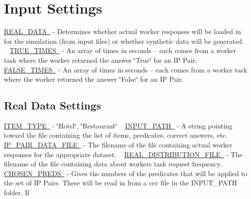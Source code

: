 \hypertarget{toggles_input}{}\section{Input Settings}\label{toggles_input}
\mbox{\hyperlink{namespacedynamicfilterapp_1_1toggles_a00674fe8ef8f59b37d7fe239813bb627}{R\+E\+A\+L\+\_\+\+D\+A\+TA }} -\/ Determines whether actual worker responses will be loaded in for the simulation (from input files) or whether synthetic data will be generated. ~\newline
 \mbox{\hyperlink{namespacedynamicfilterapp_1_1toggles_a6794acc9ab30adea862f4077cf9adae7}{T\+R\+U\+E\+\_\+\+T\+I\+M\+ES }} -\/ An array of times in seconds -- each comes from a worker task where the worker returned the answer \char`\"{}\+True\char`\"{} for an IP Pair. ~\newline
 \mbox{\hyperlink{namespacedynamicfilterapp_1_1toggles_a809d01bf46cd20093532e7cbc0960874}{F\+A\+L\+S\+E\+\_\+\+T\+I\+M\+ES }} -\/ An array of times in seconds -- each comes from a worker task where the worker returned the answer \char`\"{}\+False\char`\"{} for an IP Pair.\hypertarget{toggles_realdata}{}\subsection{Real Data Settings}\label{toggles_realdata}
\mbox{\hyperlink{namespacedynamicfilterapp_1_1toggles_ab7ef0f87c772b28128250ee46f5390ab}{I\+T\+E\+M\+\_\+\+T\+Y\+PE }} -\/ \char`\"{}\+Hotel\char`\"{}, \char`\"{}\+Restaurant\char`\"{} ~\newline
 \mbox{\hyperlink{namespacedynamicfilterapp_1_1toggles_aca6b14e235be3a92f729918cfcfed5e5}{I\+N\+P\+U\+T\+\_\+\+P\+A\+TH }} -\/ A string pointing toward the file containing the list of items, predicates, correct answers, etc.~\newline
 \mbox{\hyperlink{namespacedynamicfilterapp_1_1toggles_a43d654f8629542974ec1db04c0fc580a}{I\+P\+\_\+\+P\+A\+I\+R\+\_\+\+D\+A\+T\+A\+\_\+\+F\+I\+LE }} -\/ The filename of the file containing actual worker responses for the appropriate dataset. ~\newline
 \mbox{\hyperlink{namespacedynamicfilterapp_1_1toggles_ad581376e3eb6ca15bbbe096863891cec}{R\+E\+A\+L\+\_\+\+D\+I\+S\+T\+R\+I\+B\+U\+T\+I\+O\+N\+\_\+\+F\+I\+LE }} -\/ The filename of the file containing data about workers\textquotesingle{} task request frequency. ~\newline
 \mbox{\hyperlink{namespacedynamicfilterapp_1_1toggles_a1e059d484294d0a2661de21590419600}{C\+H\+O\+S\+E\+N\+\_\+\+P\+R\+E\+DS }} -\/ Gives the numbers of the predicates that will be applied to the set of IP Pairs. These will be read in from a csv file in the I\+N\+P\+U\+T\+\_\+\+P\+A\+TH folder. If

